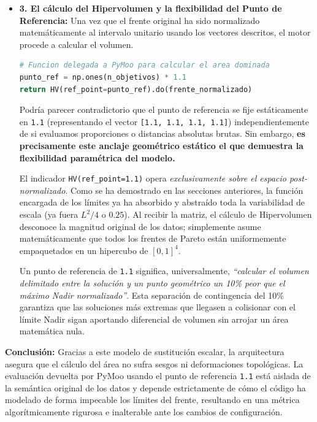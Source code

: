 \documentclass[11pt,a4paper]{article}
\begin{document}
\begin{itemize}
    \item \textbf{3. El cálculo del Hipervolumen y la flexibilidad del Punto de Referencia:} Una vez que el frente original ha sido normalizado matemáticamente al intervalo unitario usando los vectores descritos, el motor procede a calcular el volumen. 
    
\begin{lstlisting}[language=Python]
# Funcion delegada a PyMoo para calcular el area dominada
punto_ref = np.ones(n_objetivos) * 1.1
return HV(ref_point=punto_ref).do(frente_normalizado)
\end{lstlisting}

    Podría parecer contradictorio que el punto de referencia se fije estáticamente en \texttt{1.1} (representando el vector \texttt{[1.1, 1.1, 1.1, 1.1]}) independientemente de si evaluamos proporciones o distancias absolutas brutas. Sin embargo, \textbf{es precisamente este anclaje geométrico estático el que demuestra la flexibilidad paramétrica del modelo.} 

    El indicador \texttt{HV(ref\_point=1.1)} opera \textit{exclusivamente sobre el espacio post-normalizado}. Como se ha demostrado en las secciones anteriores, la función encargada de los límites ya ha absorbido y abstraído toda la variabilidad de escala (ya fuera $L^2/4$ o $0.25$). Al recibir la matriz, el cálculo de Hipervolumen desconoce la magnitud original de los datos; simplemente asume matemáticamente que todos los frentes de Pareto están uniformemente empaquetados en un hipercubo de $[0, 1]^4$.

    Un punto de referencia de \texttt{1.1} significa, universalmente, \textit{``calcular el volumen delimitado entre la solución y un punto geométrico un 10\% peor que el máximo Nadir normalizado''}. Esta separación de contingencia del 10\% garantiza que las soluciones más extremas que llegasen a colisionar con el límite Nadir sigan aportando diferencial de volumen sin arrojar un área matemática nula. 
\end{itemize}

\textbf{Conclusión:}
Gracias a este modelo de sustitución escalar, la arquitectura asegura que el cálculo del área no sufra sesgos ni deformaciones topológicas. La evaluación devuelta por PyMoo usando el punto de referencia \texttt{1.1} está aislada de la semántica original de los datos y depende estrictamente de cómo el código ha modelado de forma impecable los límites del frente, resultando en una métrica algorítmicamente rigurosa e inalterable ante los cambios de configuración.
\end{document}

